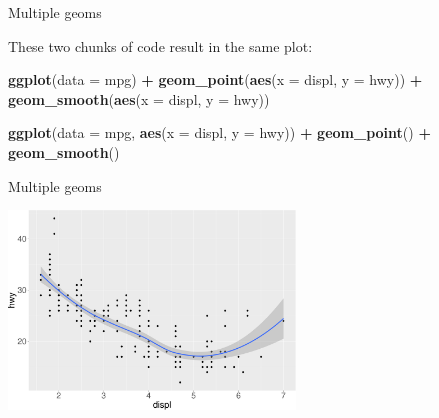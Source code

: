 \documentclass[ignorenonframetext,]{beamer}
\newenvironment{Shaded}{\begin{snugshade}}{\end{snugshade}}
\newcommand{\DataTypeTok}[1]{\textcolor[rgb]{0.13,0.29,0.53}{#1}}
\newcommand{\KeywordTok}[1]{\textcolor[rgb]{0.13,0.29,0.53}{\textbf{#1}}}
\newcommand{\NormalTok}[1]{#1}
\newcommand{\OperatorTok}[1]{\textcolor[rgb]{0.81,0.36,0.00}{\textbf{#1}}}
\newcommand{\StringTok}[1]{\textcolor[rgb]{0.31,0.60,0.02}{#1}}
\begin{document}
\begin{frame}[fragile]{Multiple geoms}
\protect\hypertarget{multiple-geoms-5}{}

These two chunks of code result in the same plot:

\begin{Shaded}
\begin{Highlighting}[]
\KeywordTok{ggplot}\NormalTok{(}\DataTypeTok{data =}\NormalTok{ mpg) }\OperatorTok{+}\StringTok{ }
\StringTok{  }\KeywordTok{geom_point}\NormalTok{(}\KeywordTok{aes}\NormalTok{(}\DataTypeTok{x =}\NormalTok{ displ, }\DataTypeTok{y =}\NormalTok{ hwy)) }\OperatorTok{+}
\StringTok{  }\KeywordTok{geom_smooth}\NormalTok{(}\KeywordTok{aes}\NormalTok{(}\DataTypeTok{x =}\NormalTok{ displ, }\DataTypeTok{y =}\NormalTok{ hwy))}
\end{Highlighting}
\end{Shaded}

\begin{Shaded}
\begin{Highlighting}[]
\KeywordTok{ggplot}\NormalTok{(}\DataTypeTok{data =}\NormalTok{ mpg, }\KeywordTok{aes}\NormalTok{(}\DataTypeTok{x =}\NormalTok{ displ, }\DataTypeTok{y =}\NormalTok{ hwy)) }\OperatorTok{+}\StringTok{ }
\StringTok{  }\KeywordTok{geom_point}\NormalTok{() }\OperatorTok{+}\StringTok{ }
\StringTok{  }\KeywordTok{geom_smooth}\NormalTok{()}
\end{Highlighting}
\end{Shaded}

\end{frame}

\begin{frame}{Multiple geoms}
\protect\hypertarget{multiple-geoms-6}{}

\begin{center}\includegraphics[height=200px]{data-visualization_files/figure-beamer/unnamed-chunk-85-1} \end{center}

\end{frame}
\end{document}
